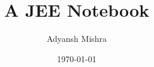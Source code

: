 \documentclass[twoside, a4paper, 10pt, bibliography=totoc, index=totoc, listof=totoc]{scrbook}
\begin{document}
    \author{Adyansh Mishra}
    \date{\today}
    \title{A JEE Notebook}
    \fncytitle

    \tableofcontents
     
    \frontmatter
    
    
\end{document}
